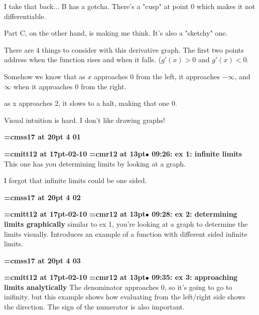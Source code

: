 I take that back... B has a gotcha. There's a "cusp" at point 0 which makes it not differentiable.
\par

Part C, on the other hand, is making me think. It's also a "sketchy" one.
\par

There are 4 things to consider with this derivative graph. The first two points address when the function rises and when it falls. ($g'(x) > 0$ and $g'(x) < 0$.
\par

Somehow we know that as $x$ approaches $0$ from the left, it approaches $-\infty$, and $\infty$ when it approaches 0 from the right.
\par

as x approaches 2, it slows to a halt, making that one 0.
\par

Visual intuition is hard. I don't like drawing graphs!
\par

{\medskip\noindent\bf\font\titlefont=cmss17 at 20pt 4 01}\medskip

{\medskip\noindent\bf\font\titlefont=cmitt12 at 17pt-02-10}\medskip
{\smallskip\noindent\bf\font\titlefont=cmr12 at 13pt\titlefont $\bullet$ 09:26: ex 1: infinite limits}\smallskip
This one has you determining limits by looking at a graph.
\par

I forgot that infinite limits could be one sided.
\par

{\medskip\noindent\bf\font\titlefont=cmss17 at 20pt 4 02}\medskip

{\medskip\noindent\bf\font\titlefont=cmitt12 at 17pt-02-10}\medskip
{\smallskip\noindent\bf\font\titlefont=cmr12 at 13pt\titlefont $\bullet$ 09:28: ex 2: determining limits graphically}\smallskip
similar to ex 1, you're looking at a graph to determine the limits visually. Introduces an example of a function with different sided infinite limits.
\par

{\medskip\noindent\bf\font\titlefont=cmss17 at 20pt 4 03}\medskip

{\medskip\noindent\bf\font\titlefont=cmitt12 at 17pt-02-10}\medskip
{\smallskip\noindent\bf\font\titlefont=cmr12 at 13pt\titlefont $\bullet$ 09:35: ex 3: approaching limits analytically}\smallskip
The denominator approaches 0, so it's going to go to inifinity. but this example shows how evaluating from the left/right side shows the direction. The sign of the numerator is also important.
\par

